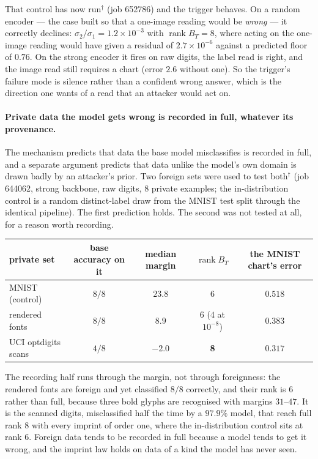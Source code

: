 That control has now run$^\dagger$ (job 652786) and the trigger behaves. On a
random encoder --- the case built so that a one-image reading would be
\emph{wrong} --- it correctly declines: $\sigma_2/\sigma_1=1.2\times10^{-3}$
with $\operatorname{rank}B_T=8$, where acting on the one-image reading would
have given a residual of $2.7\times10^{-6}$ against a predicted floor of
$0.76$. On the strong encoder it fires on raw digits, the label read is right,
and the image read still requires a chart (error $2.6$ without one). So the
trigger's failure mode is silence rather than a confident wrong answer, which
is the direction one wants of a read that an attacker would act on.

\paragraph{Private data the model gets wrong is recorded in full, whatever
its provenance.} The mechanism predicts that data the base model
misclassifies is recorded in full, and a separate argument predicts that
data unlike the model's own domain is drawn badly by an attacker's prior.
Two foreign sets were used to test both$^\dagger$ (job 644062, strong
backbone, raw digits, $8$ private examples; the in-distribution control is a
random distinct-label draw from the MNIST test split through the identical
pipeline). The first prediction holds. The second was not tested at all, for
a reason worth recording.
\begin{center}\small
\begin{tabular}{@{}lcccc@{}}\toprule
private set & base accuracy on it & median margin & $\operatorname{rank}B_T$ & the MNIST chart's error\\ \midrule
MNIST (control) & $8/8$ & $23.8$ & $6$ & $0.518$\\
rendered fonts & $8/8$ & $8.9$ & $6$ ($4$ at $10^{-8}$) & $0.383$\\
UCI optdigits scans & $4/8$ & $-2.0$ & \textbf{8} & $0.317$\\ \bottomrule
\end{tabular}
\end{center}
The recording half runs through the margin, not through foreignness: the
rendered fonts are foreign and yet classified $8/8$ correctly, and their rank
is $6$ rather than full, because three bold glyphs are recognised with
margins $31$--$47$. It is the scanned digits, misclassified half the time by
a $97.9\%$ model, that reach full rank $8$ with every imprint of order one,
where the in-distribution control sits at rank $6$. Foreign data tends to be
recorded in full because a model tends to get it wrong, and the imprint law
holds on data of a kind the model has never seen.

